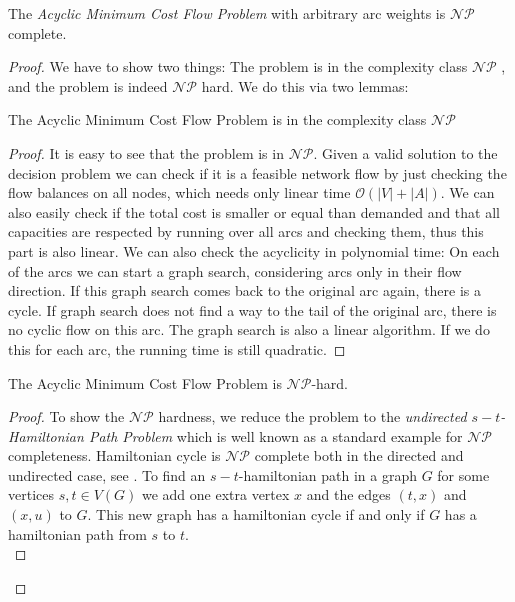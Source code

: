 \begin{theorem}
 The \textit{Acyclic Minimum Cost Flow Problem} with arbitrary arc weights is $\mathcal{NP}$ complete.
\end{theorem}
\begin{proof}
 We have to show two things: The problem is in the complexity class $\mathcal{NP}$ , and the problem is indeed 
$\mathcal{NP}$ hard. We do this via two lemmas:
\begin{lemma}
 The Acyclic Minimum Cost Flow Problem is in the complexity class $\mathcal{NP}$
\end{lemma}
\begin{proof}
It is easy to see that the problem is in $\mathcal{NP}$. Given a valid solution to the decision problem we can check if 
it is a feasible network flow by just checking the flow balances on all nodes, which needs only linear time 
$\mathcal{O}(|V|+|A|)$. We can also easily check if the total cost is smaller or equal than demanded and that all 
capacities are respected by running over all arcs and checking them, thus this part is also linear.
We can also check the acyclicity in polynomial time: On each of the arcs we can start a graph search, considering arcs 
only in their flow direction. If this graph search comes back to the original arc again, there is a cycle. %
If graph search does not find a way to the tail of the original arc, there is no cyclic flow on this arc. The graph 
search is also a linear algorithm. If we do this for each arc, the running time is still quadratic.
\end{proof}

\begin{lemma}
 The Acyclic Minimum Cost Flow Problem is $\mathcal{NP}$-hard.
\end{lemma}
\begin{proof}

To show the $\mathcal{NP}$ hardness, we reduce the problem to the \textit{undirected $s-t$-Hamiltonian Path Problem} 
which is well known as a standard example for $\mathcal{NP}$ completeness. Hamiltonian cycle is $\mathcal{NP}$ 
complete both in the directed and undirected case, see \cite{Karp1972}. To find an $s-t$-hamiltonian path in a graph 
$G$ for some vertices $s,t\in V(G)$ we add one extra vertex $x$ and the edges $(t,x)$ and $(x,u)$ to $G$. This new 
graph has a hamiltonian cycle if and only if $G$ has a hamiltonian path from $s$ to $t$. \\


\end{proof}
\end{proof}
